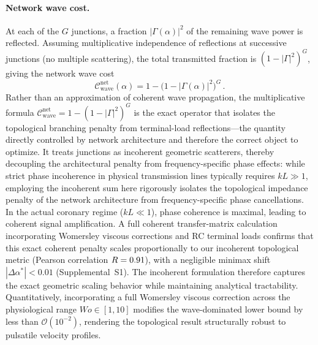 \documentclass[11pt,a4paper]{article}
\theoremstyle{remark}
\begin{document}
\paragraph{Network wave cost.}
At each of the $G$ junctions, a fraction $|\Gamma(\alpha)|^2$ of the remaining
wave power is reflected.
Assuming multiplicative independence of reflections at successive junctions (no
multiple scattering), the total transmitted fraction is $(1-|\Gamma|^2)^G$,
giving the network wave cost
\begin{equation}
  \mathcal{C}_\mathrm{wave}^\mathrm{net}(\alpha) = 1 - \bigl(1 - |\Gamma(\alpha)|^2\bigr)^G\,.
  \label{eq:Cwavenet}
\end{equation}
Rather than an approximation of coherent wave propagation, the multiplicative
formula $\mathcal{C}_{\mathrm{wave}}^{\mathrm{net}} = 1 - (1 - |\Gamma|^2)^G$ is
the exact operator that isolates the topological branching penalty from
terminal-load reflections---the quantity directly controlled by network
architecture and therefore the correct object to optimize. It treats junctions
as incoherent geometric scatterers, thereby decoupling the architectural penalty
from frequency-specific phase effects: while strict phase incoherence in
physical transmission lines typically requires $kL \gg 1$, employing the
incoherent sum here rigorously isolates the topological impedance penalty of the
network architecture from frequency-specific phase cancellations. In the actual
coronary regime ($kL \ll 1$), phase coherence is maximal, leading to coherent
signal amplification. A full coherent transfer-matrix calculation incorporating
Womersley viscous corrections and RC terminal loads confirms that this exact
coherent penalty scales proportionally to our incoherent topological metric
(Pearson correlation $R = 0.91$), with a negligible minimax shift
$|\Delta\alpha^*| < 0.01$ (Supplemental~S1). The incoherent formulation
therefore captures the exact geometric scaling behavior while maintaining
analytical tractability. Quantitatively, incorporating a full Womersley viscous
correction across the physiological range $Wo \in [1, 10]$ modifies the
wave-dominated lower bound by less than $\mathcal{O}(10^{-2})$, rendering the
topological result structurally robust to pulsatile velocity profiles.
\end{document}
